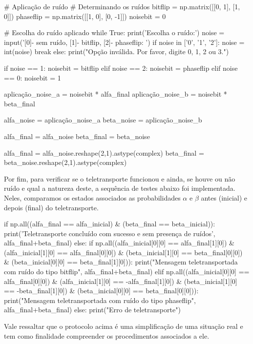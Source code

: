 \begin{pycode}
    # Aplicação de ruído
    # Determinando os ruídos
    bitflip = np.matrix([[0, 1], [1, 0]])
    phaseflip = np.matrix([[1, 0], [0, -1]])
    noisebit = 0

    # Escolha do ruído aplicado
    while True:
        print('Escolha o ruído:')
        noise = input('[0]- sem ruído, [1]- bitflip, [2]- phaseflip: ')
        if noise in ['0', '1', '2']:
            noise = int(noise)
            break
        else:
            print("Opção inválida. Por favor, digite 0, 1, 2 ou 3.")

    if noise == 1:
        noisebit = bitflip
    elif noise == 2:
        noisebit = phaseflip
    elif noise == 0:
        noisebit = 1

    aplicação_noise_a = noisebit * alfa_final
    aplicação_noise_b = noisebit * beta_final

    alfa_noise = aplicação_noise_a
    beta_noise = aplicação_noise_b

    alfa_final = alfa_noise
    beta_final = beta_noise
    
    alfa_final = alfa_noise.reshape(2,1).astype(complex)
	beta_final = beta_noise.reshape(2,1).astype(complex)
\end{pycode}

Por fim, para verificar se o teletransporte funcionou e ainda, se houve ou não ruído e qual a natureza deste, a sequência de testes abaixo foi implementada. Neles, comparamos os estados associados as probabilidades \(\alpha\) e \(\beta\) antes (inicial) e depois (final) do teletransporte.

\begin{pycode}
    if np.all((alfa_final == alfa_inicial) & (beta_final == beta_inicial)):
        print('Teletransporte concluído com sucesso e sem presença de ruídos', alfa_final+beta_final)
    else:
        if np.all((alfa_inicial[0][0] == alfa_final[1][0]) &
                    (alfa_inicial[1][0] == alfa_final[0][0]) &
                    (beta_inicial[1][0] == beta_final[0][0]) &
                    (beta_inicial[0][0] == beta_final[1][0])):
            print("Mensagem teletransportada com ruído do tipo bitflip", alfa_final+beta_final)
        elif np.all((alfa_inicial[0][0] == alfa_final[0][0]) &
                    (alfa_inicial[1][0] == -alfa_final[1][0]) &
                    (beta_inicial[1][0] == -beta_final[1][0]) &
                    (beta_inicial[0][0] == beta_final[0][0])):
            print("Mensagem teletransportada com ruído do tipo phaseflip", alfa_final+beta_final)
        else:
            print("Erro de teletransporte")
\end{pycode}

Vale ressaltar que o protocolo acima é uma simplificação de uma situação real e tem como finalidade compreender os procedimentos associados a ele.
